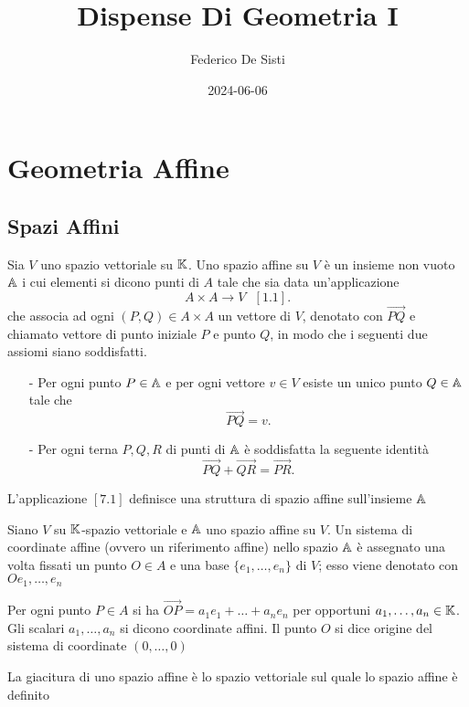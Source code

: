 \documentclass[12px]{article}
\title{Dispense Di Geometria I}
\date{2024-06-06}
\author{Federico De Sisti}
\begin{document}
	\maketitle
	\newpage
	\section{Geometria Affine}
	\subsection{Spazi Affini}
	\begin{defi}
		Sia $V$ uno spazio vettoriale su $\mathbb{K}$. Uno spazio affine su $V$ è un insieme non vuoto $\mathbb{A}$ i cui elementi si dicono punti di $A$ tale che sia data un'applicazione
		\[
			A\times A \rightarrow V \ \ \ [1.1]
		.\] 
		che associa ad ogni $(P,Q)\in A\times A$ un vettore di  $V$, denotato con $ \overrightarrow{PQ}$ e chiamato vettore di punto iniziale $P$ e punto  $Q$, in modo che i seguenti due assiomi siano soddisfatti.
		\begin{itemize}
			\item[-] Per ogni punto $P\in \mathbb{A}$ e per ogni vettore $v\in V$ esiste un unico punto $Q\in \mathbb{A}$ tale che
				\[
				 \overrightarrow{PQ} = v
				.\]  
			\item[-] Per ogni terna $P,Q,R$ di punti di $\mathbb{A}$ è soddisfatta la seguente identità
				\[
				 \overrightarrow{PQ}+\overrightarrow{QR}=\overrightarrow{PR}
				.\] 
		\end{itemize}
				L'applicazione $[7.1]$ definisce una struttura di spazio affine sull'insieme  $\mathbb{A}$
	\end{defi}
	\begin{defi}
		Siano $V$ su $\mathbb{K}$-spazio vettoriale e $\mathbb{A}$ uno spazio affine su $V$. Un sistema di coordinate affine (ovvero un riferimento affine) nello spazio $\mathbb{A}$ è assegnato una volta fissati un punto $O\in A$ e una base $ \{e_1,\ldots,e_n\}$ di $V$; esso viene denotato con $Oe_1,\ldots,e_n$
	\end{defi}
	\begin{defi}
		Per ogni punto $P\in A$ si ha $ \overrightarrow{OP} = a_1e_1+\ldots+a_ne_n$ per opportuni $a_1,\ldots, a_n\in \mathbb{K}$.\\
		Gli scalari $a_1,\ldots,a_n$ si dicono coordinate affini. Il punto $O$ si dice origine del sistema di coordinate $(0,\ldots,0)$
	\end{defi}
	\begin{defi}[Giacitura]
		La giacitura di uno spazio affine è lo spazio vettoriale sul quale lo spazio affine è definito
	\end{defi}
\end{document}
